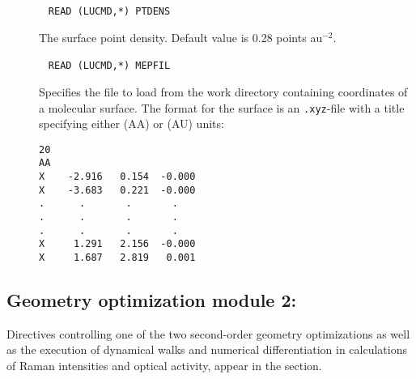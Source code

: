 \begin{description}
\item[]\verb| |\newline
\verb|READ (LUCMD,*) PTDENS|

The surface point density. Default value is 0.28 points au$^{-2}$.

\item[]\verb| |\newline
\verb|READ (LUCMD,*) MEPFIL|

Specifies the file to load from the work directory containing coordinates of a molecular surface.
The format for the surface is an \verb|.xyz|-file with a title specifying either \angstrom{} (AA) or \bohr{} (AU) units:
\begin{verbatim}
20
AA
X    -2.916   0.154  -0.000
X    -3.683   0.221  -0.000
.      .       .       .
.      .       .       .
.      .       .       .
X     1.291   2.156  -0.000
X     1.687   2.819   0.001
\end{verbatim}

\end{description}


\subsection{Geometry optimization module 2: }
\label{sec:abawalk}

Directives controlling one of the two second-order
geometry
optimizations  as well as the
execution of dynamical walks and numerical
differentiation in
calculations of Raman intensities and optical activity,
appear in the  section.

